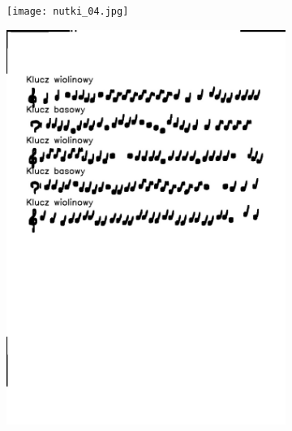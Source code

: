 \documentclass[11pt]{article}
\begin{document}
\begin{figure}[H]
    \centering
    \begin{subfigure}{.5\textwidth}
        \centering
        \graphicspath{ {Resources/} }
        \texttt{[image: nutki\_04.jpg]}
        \label{figsub1}
    \end{subfigure}%
    \begin{subfigure}{.5\textwidth}
        \centering
        \graphicspath{ {keys/} }
        \includegraphics[width=.9\linewidth]{image_4.jpg}
        \label{figsub2}
    \end{subfigure}
    \label{figwykKlucze01}
\end{figure}
\end{document}
